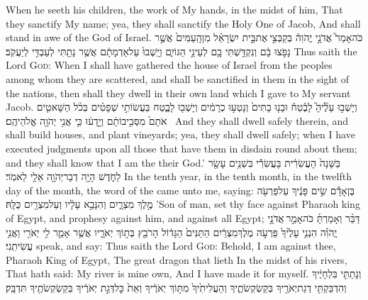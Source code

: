 {When he seeth his children, the work of My hands, in the midst of him, That they sanctify My name; yea, they shall sanctify the Holy One of Jacob, And shall stand in awe of the God of Israel.}
\label{haft_14}
\setcounter{chap}{28}
\setcounter{verse}{25}
{כֹּה\maqqaf אָמַר֮ אֲדֹנָ֣י יֱהֹוִה֒ בְּקַבְּצִ֣י \legarmeh  אֶת\maqqaf בֵּ֣ית יִשְׂרָאֵ֗ל מִן\maqqaf הָֽעַמִּים֙ אֲשֶׁ֣ר נָפֹ֣צוּ בָ֔ם וְנִקְדַּ֥שְׁתִּי בָ֖ם לְעֵינֵ֣י הַגּוֹיִ֑ם וְיָֽשְׁבוּ֙ עַל\maqqaf אַדְמָתָ֔ם אֲשֶׁ֥ר נָתַ֖תִּי לְעַבְדִּ֥י לְיַעֲקֹֽב׃}
{Thus saith the Lord \textsc{God}: When I shall have gathered the house of Israel from the peoples among whom they are scattered, and shall be sanctified in them in the sight of the nations, then shall they dwell in their own land which I gave to My servant Jacob.}
{וְיָשְׁב֣וּ עָלֶ֘יהָ֮ לָבֶ֒טַח֒ וּבָנ֤וּ בָתִּים֙ וְנָטְע֣וּ כְרָמִ֔ים וְיָשְׁב֖וּ לָבֶ֑טַח בַּעֲשׂוֹתִ֣י שְׁפָטִ֗ים בְּכֹ֨ל הַשָּׁאטִ֤ים אֹתָם֙ מִסְּבִ֣יבוֹתָ֔ם וְיָ֣דְע֔וּ כִּ֛י אֲנִ֥י יְהֹוָ֖ה אֱלֹהֵיהֶֽם׃ \petucha }
{And they shall dwell safely therein, and shall build houses, and plant vineyards; yea, they shall dwell safely; when I have executed judgments upon all those that have them in disdain round about them; and they shall know that I am the \lord\space their God.’}
\newperek
{}
{בַּשָּׁנָה֙ הָעֲשִׂרִ֔ית בָּעֲשִׂרִ֕י בִּשְׁנֵ֥ים עָשָׂ֖ר לַחֹ֑דֶשׁ הָיָ֥ה דְבַר\maqqaf יְהֹוָ֖ה אֵלַ֥י לֵאמֹֽר׃}
{In the tenth year, in the tenth month, in the twelfth day of the month, the word of the \lord\space came unto me, saying:}
{בֶּן\maqqaf אָדָ֕ם שִׂ֣ים פָּנֶ֔יךָ עַל\maqqaf פַּרְעֹ֖ה מֶ֣לֶךְ מִצְרָ֑יִם וְהִנָּבֵ֣א עָלָ֔יו וְעַל\maqqaf מִצְרַ֖יִם כֻּלָּֽהּ׃}
{’Son of man, set thy face against Pharaoh king of Egypt, and prophesy against him, and against all Egypt;}
{דַּבֵּ֨ר וְאָמַרְתָּ֜ כֹּה\maqqaf אָמַ֣ר \legarmeh  אֲדֹנָ֣י יֱהֹוִ֗ה הִנְנִ֤י עָלֶ֙יךָ֙ פַּרְעֹ֣ה מֶלֶךְ\maqqaf מִצְרַ֔יִם הַתַּנִּים֙ הַגָּד֔וֹל הָרֹבֵ֖ץ בְּת֣וֹךְ יְאֹרָ֑יו אֲשֶׁ֥ר אָמַ֛ר לִ֥י יְאֹרִ֖י וַאֲנִ֥י עֲשִׂיתִֽנִי׃}
{speak, and say: Thus saith the Lord \textsc{God}: Behold, I am against thee, Pharaoh King of Egypt, The great dragon that lieth In the midst of his rivers, That hath said: My river is mine own, And I have made it for myself.}
{וְנָתַתִּ֤י  בִּלְחָיֶ֔יךָ וְהִדְבַּקְתִּ֥י דְגַת\maqqaf יְאֹרֶ֖יךָ בְּקַשְׂקְשֹׂתֶ֑יךָ וְהַעֲלִיתִ֙יךָ֙ מִתּ֣וֹךְ יְאֹרֶ֔יךָ וְאֵת֙ כׇּל\maqqaf דְּגַ֣ת יְאֹרֶ֔יךָ בְּקַשְׂקְשֹׂתֶ֖יךָ תִּדְבָּֽק׃}

